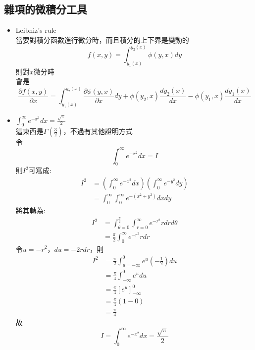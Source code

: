 \documentclass[../main.tex]{subfiles}
\begin{document}
\subsection{雜項的微積分工具}
\begin{itemize}
  \item Leibniz's rule\\
    當要對積分函數進行微分時，而且積分的上下界是變動的
    \begin{equation}
      f(x,y) = \int_{y_1(x)}^{y_2(x)} \phi(y,x) dy
    \end{equation}
    則對$x$微分時\\
    會是
    \begin{equation}
      \frac{\partial f(x,y)}{\partial x} = \int_{y_1(x)}^{y_2(x)} \frac{\partial \phi(y,x)}{\partial x} dy 
      + \phi(y_2,x) \frac{dy_2(x)}{dx} 
      - \phi(y_1,x) \frac{dy_1(x)}{dx} \label{eq:leibniz_rule}
    \end{equation}
  \item $\int_0^\infty e^{-x^2} dx = \frac{\sqrt{\pi}}{2}$ \label{sec:error_function_proof}\\
    這東西是$\Gamma(\frac{3}{2})$，不過有其他證明方式\\
    令
    \begin{equation}
      \int_0^\infty e^{-x^2} dx = I
    \end{equation}
    則$I^2$可寫成:
    \begin{align}
      I^2 &= \left(\int_0^\infty e^{-x^2} dx\right)\left(\int_0^\infty e^{-y^2} dy\right) \nonumber\\
      &= \int_0^\infty \int_0^\infty e^{-(x^2+y^2)} dx dy
    \end{align}
    將其轉為:
    \begin{align}
      I^2 &= \int_{\theta=0}^{\frac{\pi}{2}} \int_{r=0}^{\infty} e^{-r^2} r dr d\theta \nonumber\\
      &= \frac{\pi}{2} \int_0^\infty e^{-r^2} r dr
    \end{align}
    令$u=-r^2$，$du=-2r dr$，則
    \begin{align}
      I^2 &= \frac{\pi}{2} \int_{u=-\infty}^{0} e^{u} \left(-\frac{1}{2}\right) du \nonumber\\
      &= \frac{\pi}{4} \int_{-\infty}^{0} e^{u} du \nonumber\\
      &= \frac{\pi}{4} \left[e^{u}\right]_{-\infty}^{0} \nonumber\\
      &= \frac{\pi}{4} (1-0) \nonumber\\
      &= \frac{\pi}{4}
    \end{align}
    故
    \begin{equation}
      \boxed{I = \int_0^\infty e^{-x^2} dx = \frac{\sqrt{\pi}}{2}}
    \end{equation}
\end{itemize}
\end{document}
